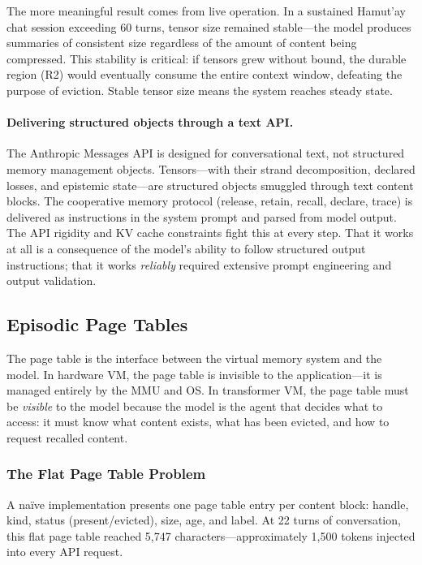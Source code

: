 \documentclass[sigplan,screen,anonymous]{acmart}
\begin{document}
The more meaningful result comes from live operation. In a sustained
Hamut'ay chat session exceeding 60 turns, tensor size remained
stable---the model produces summaries of consistent size regardless
of the amount of content being compressed. This stability is critical:
if tensors grew without bound, the durable region (R2) would
eventually consume the entire context window, defeating the purpose of
eviction. Stable tensor size means the system reaches steady state.

\paragraph{Delivering structured objects through a text API.}
The Anthropic Messages API is designed for conversational text, not
structured memory management objects. Tensors---with their strand
decomposition, declared losses, and epistemic state---are structured
objects smuggled through text content blocks. The cooperative memory
protocol (release, retain, recall, declare, trace) is delivered as
instructions in the system prompt and parsed from model output. The
API rigidity and KV cache constraints fight this at every step. That
it works at all is a consequence of the model's ability to follow
structured output instructions; that it works \emph{reliably} required
extensive prompt engineering and output validation.

\subsection{Episodic Page Tables}
\label{sec:episodic-pt}

The page table is the interface between the virtual memory system and
the model. In hardware VM, the page table is invisible to the
application---it is managed entirely by the MMU and OS. In transformer
VM, the page table must be \emph{visible} to the model because the
model is the agent that decides what to access: it must know what
content exists, what has been evicted, and how to request recalled
content.

\subsubsection{The Flat Page Table Problem}

A na\"ive implementation presents one page table entry per content
block: handle, kind, status (present/evicted), size, age, and label.
At 22 turns of conversation, this flat page table reached 5,747
characters---approximately 1,500 tokens injected into every API
request.
\end{document}
